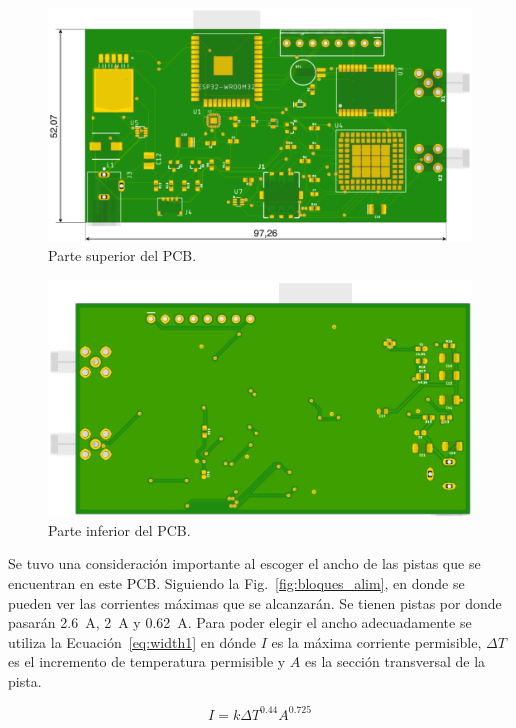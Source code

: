 \begin{figure}[hbtp!]
\centering
\includegraphics[width=\textwidth]{board_top_dim.pdf}
\caption{Parte superior del PCB.}
\label{fig:board_top}
\end{figure}

\begin{figure}[hbtp!]
\centering
\includegraphics[width=\textwidth]{board_bottom.png}
\caption{Parte inferior del PCB.}
\label{fig:board_bottom}
\end{figure}

Se tuvo una consideración importante al escoger el ancho de las pistas que se encuentran en este PCB. Siguiendo la Fig.~\ref{fig:bloques_alim}, en donde se pueden ver las corrientes máximas que se alcanzarán. Se tienen pistas por donde pasarán \SI{2.6}{A}, \SI{2}{A} y \SI{0.62}{A}. Para poder elegir el ancho adecuadamente se utiliza la Ecuación~\ref{eq:width1} en dónde $I$ es la máxima corriente permisible, $\Delta T$ es el incremento de temperatura permisible y $A$ es la sección transversal de la pista.

\begin{equation}
    I = k\Delta T^{0.44}A^{0.725}
    \label{eq:width1}
\end{equation}


